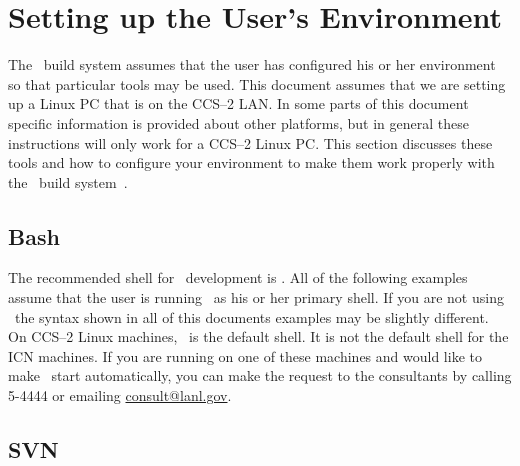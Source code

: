 
\section{Setting up the User's Environment}

The \draco\ build system assumes that the user has configured his or
her environment so that particular tools may be used.  This document
assumes that we are setting up a Linux PC that is on the CCS--2 LAN.
In some parts of this document specific information is provided about
other platforms, but in general these instructions will only work for
a CCS--2 Linux PC.  This section discusses these tools and how to
configure your environment to make them work properly with the
\draco\ build system~\cite{draco-build}.

\subsection{Bash}

The recommended shell for \draco\ development is \bash.  All of the
following examples assume that the user is running \bash\ as his or
her primary shell.  If you are not using \bash\ the syntax shown in
all of this documents examples may be slightly different.  On CCS--2
Linux machines, \bash\ is the default shell.  It is not the default
shell for the ICN machines.  If you are running on one of these
machines and would like to make \bash\ start automatically, you can
make the request to the consultants by calling 5-4444 or emailing
\url{consult@lanl.gov}.




\subsection{SVN}

